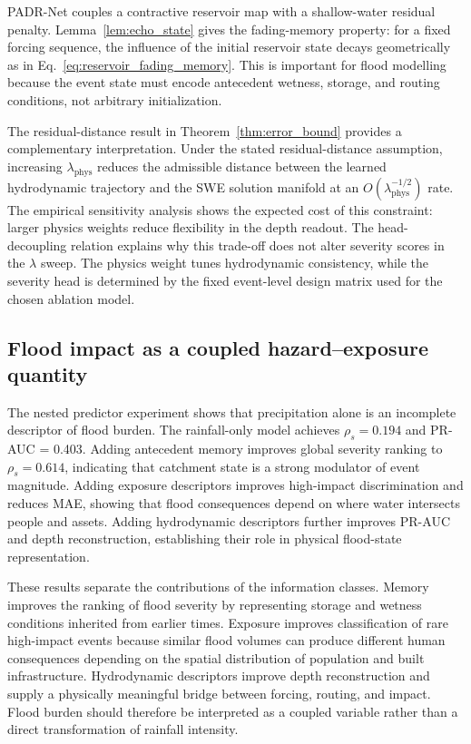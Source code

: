 \documentclass[pdflatex,sn-mathphys-ay]{sn-jnl}
\theoremstyle{thmstyleone}
\begin{document}
PADR-Net couples a contractive reservoir map with a shallow-water
residual penalty.  Lemma~\ref{lem:echo_state} gives the
fading-memory property: for a fixed forcing sequence, the influence of
the initial reservoir state decays geometrically as in
Eq.~\eqref{eq:reservoir_fading_memory}.  This is important for flood
modelling because the event state must encode antecedent wetness,
storage, and routing conditions, not arbitrary initialization.

The residual-distance result in Theorem~\ref{thm:error_bound} provides
a complementary interpretation.  Under the stated residual-distance
assumption, increasing $\lambda_{\mathrm{phys}}$ reduces the admissible
distance between the learned hydrodynamic trajectory and the SWE
solution manifold at an $O(\lambda_{\mathrm{phys}}^{-1/2})$ rate.  The
empirical sensitivity analysis shows the expected cost of this
constraint: larger physics weights reduce flexibility in the depth
readout.  The head-decoupling relation explains why this
trade-off does not alter severity scores in the $\lambda$ sweep.  The
physics weight tunes hydrodynamic consistency, while the severity head
is determined by the fixed event-level design matrix used for the
chosen ablation model.

\subsection{Flood impact as a coupled hazard--exposure quantity}

The nested predictor experiment shows that precipitation alone is an
incomplete descriptor of flood burden.  The rainfall-only model
achieves $\rho_s=0.194$ and PR-AUC = 0.403.  Adding antecedent memory
improves global severity ranking to $\rho_s=0.614$, indicating that
catchment state is a strong modulator of event magnitude.  Adding
exposure descriptors improves high-impact discrimination and reduces
MAE, showing that flood consequences depend on where water intersects
people and assets.  Adding hydrodynamic descriptors further improves
PR-AUC and depth reconstruction, establishing their role in physical
flood-state representation.

These results separate the contributions of the information classes.
Memory improves the ranking of flood severity by representing storage
and wetness conditions inherited from earlier times.  Exposure improves
classification of rare high-impact events because similar flood
volumes can produce different human consequences depending on the
spatial distribution of population and built infrastructure.
Hydrodynamic descriptors improve depth reconstruction and supply a
physically meaningful bridge between forcing, routing, and impact.
Flood burden should therefore be interpreted as a coupled variable
rather than a direct transformation of rainfall intensity.
\end{document}
